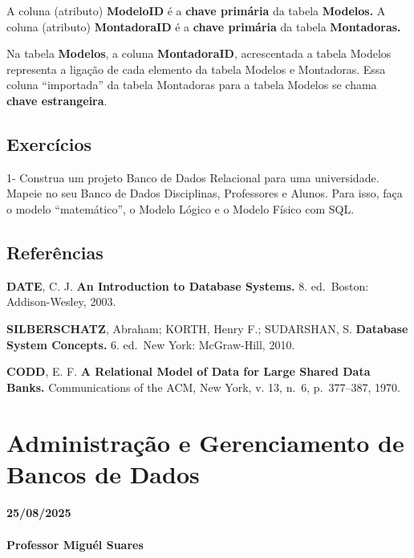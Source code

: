 \documentclass[
]{book}
\begin{document}
A coluna (atributo) \textbf{ModeloID} é a \textbf{chave primária} da tabela \textbf{Modelos.} A coluna (atributo) \textbf{MontadoraID} é a \textbf{chave primária} da tabela \textbf{Montadoras.}

Na tabela \textbf{Modelos}, a coluna \textbf{MontadoraID}, acrescentada a tabela Modelos representa a ligação de cada elemento da tabela Modelos e Montadoras. Essa coluna ``importada'' da tabela Montadoras para a tabela Modelos se chama \textbf{chave estrangeira}.

\section{Exercícios}\label{exercuxedcios}

1- Construa um projeto Banco de Dados Relacional para uma universidade. Mapeie
no seu Banco de Dados Disciplinas, Professores e Alunos.
Para isso, faça o modelo ``matemático'', o Modelo Lógico e o Modelo Físico com SQL.

\section{Referências}\label{referuxeancias}

\textbf{DATE}, C. J. \textbf{An Introduction to Database Systems.} 8. ed.~Boston: Addison-Wesley, 2003.

\textbf{SILBERSCHATZ}, Abraham; KORTH, Henry F.; SUDARSHAN, S. \textbf{Database System Concepts.} 6. ed.~New York: McGraw-Hill, 2010.

\textbf{CODD}, E. F. \textbf{A Relational Model of Data for Large Shared Data Banks.} Communications of the ACM, New York, v. 13, n.~6, p.~377--387, 1970.

\chapter{Administração e Gerenciamento de Bancos de Dados}\label{administrauxe7uxe3o-e-gerenciamento-de-bancos-de-dados}

\subsubsection*{25/08/2025}\label{section-3}

\subsubsection*{Professor Miguél Suares}\label{professor-miguuxe9l-suares-3}
\end{document}
